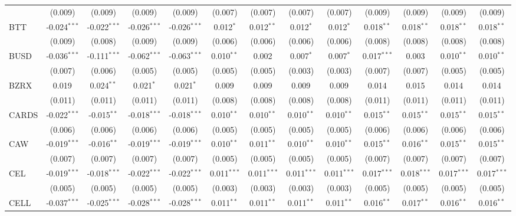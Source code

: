 \begin{table}[!htbp]
\begin{tabular}{@{\extracolsep{5pt}}lcccccccccccc}
  & (0.009) & (0.009) & (0.009) & (0.009) & (0.007) & (0.007) & (0.007) & (0.007) & (0.009) & (0.009) & (0.009) & (0.009) \\
 BTT & -0.024$^{***}$ & -0.022$^{***}$ & -0.026$^{***}$ & -0.026$^{***}$ & 0.012$^{*}$ & 0.012$^{**}$ & 0.012$^{*}$ & 0.012$^{*}$ & 0.018$^{**}$ & 0.018$^{**}$ & 0.018$^{**}$ & 0.018$^{**}$ \\
  & (0.009) & (0.008) & (0.009) & (0.009) & (0.006) & (0.006) & (0.006) & (0.006) & (0.008) & (0.008) & (0.008) & (0.008) \\
 BUSD & -0.036$^{***}$ & -0.111$^{***}$ & -0.062$^{***}$ & -0.063$^{***}$ & 0.010$^{**}$ & 0.002$^{}$ & 0.007$^{*}$ & 0.007$^{*}$ & 0.017$^{***}$ & 0.003$^{}$ & 0.010$^{**}$ & 0.010$^{**}$ \\
  & (0.007) & (0.006) & (0.005) & (0.005) & (0.005) & (0.005) & (0.003) & (0.003) & (0.007) & (0.007) & (0.005) & (0.005) \\
 BZRX & 0.019$^{}$ & 0.024$^{**}$ & 0.021$^{*}$ & 0.021$^{*}$ & 0.009$^{}$ & 0.009$^{}$ & 0.009$^{}$ & 0.009$^{}$ & 0.014$^{}$ & 0.015$^{}$ & 0.014$^{}$ & 0.014$^{}$ \\
  & (0.011) & (0.011) & (0.011) & (0.011) & (0.008) & (0.008) & (0.008) & (0.008) & (0.011) & (0.011) & (0.011) & (0.011) \\
 CARDS & -0.022$^{***}$ & -0.015$^{**}$ & -0.018$^{***}$ & -0.018$^{***}$ & 0.010$^{**}$ & 0.010$^{**}$ & 0.010$^{**}$ & 0.010$^{**}$ & 0.015$^{**}$ & 0.015$^{**}$ & 0.015$^{**}$ & 0.015$^{**}$ \\
  & (0.006) & (0.006) & (0.006) & (0.006) & (0.005) & (0.005) & (0.005) & (0.005) & (0.006) & (0.006) & (0.006) & (0.006) \\
 CAW & -0.019$^{***}$ & -0.016$^{**}$ & -0.019$^{***}$ & -0.019$^{***}$ & 0.010$^{**}$ & 0.011$^{**}$ & 0.010$^{**}$ & 0.010$^{**}$ & 0.015$^{**}$ & 0.016$^{**}$ & 0.015$^{**}$ & 0.015$^{**}$ \\
  & (0.007) & (0.007) & (0.007) & (0.007) & (0.005) & (0.005) & (0.005) & (0.005) & (0.007) & (0.007) & (0.007) & (0.007) \\
 CEL & -0.019$^{***}$ & -0.018$^{***}$ & -0.022$^{***}$ & -0.022$^{***}$ & 0.011$^{***}$ & 0.011$^{***}$ & 0.011$^{***}$ & 0.011$^{***}$ & 0.017$^{***}$ & 0.018$^{***}$ & 0.017$^{***}$ & 0.017$^{***}$ \\
  & (0.005) & (0.005) & (0.005) & (0.005) & (0.003) & (0.003) & (0.003) & (0.003) & (0.005) & (0.005) & (0.005) & (0.005) \\
 CELL & -0.037$^{***}$ & -0.025$^{***}$ & -0.028$^{***}$ & -0.028$^{***}$ & 0.011$^{**}$ & 0.011$^{**}$ & 0.011$^{**}$ & 0.011$^{**}$ & 0.016$^{**}$ & 0.017$^{**}$ & 0.016$^{**}$ & 0.016$^{**}$ \\

\end{tabular}
\end{table}
